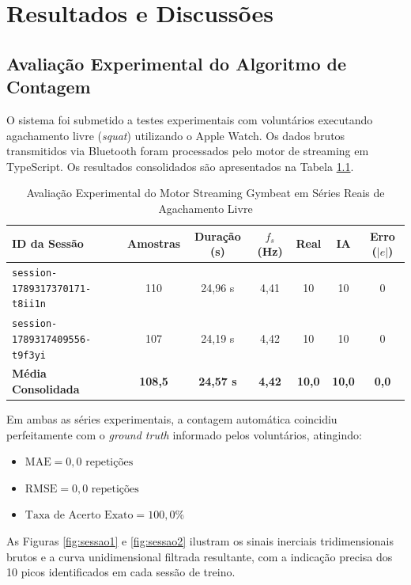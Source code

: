 \documentclass[12pt,openany,oneside,a4paper,english,brazil]{abntex2}
\begin{document}
\chapter{Resultados e Discussões}

\section{Avaliação Experimental do Algoritmo de Contagem}
O sistema foi submetido a testes experimentais com voluntários executando agachamento livre (\textit{squat}) utilizando o Apple Watch. Os dados brutos transmitidos via Bluetooth foram processados pelo motor de streaming em TypeScript. Os resultados consolidados são apresentados na Tabela \ref{tab:resultados}.

\begin{table}[H]
\centering
\caption{Avaliação Experimental do Motor Streaming Gymbeat em Séries Reais de Agachamento Livre}
\label{tab:resultados}
\begin{tabular}{lcccccc}
\toprule
\textbf{ID da Sessão} & \textbf{Amostras} & \textbf{Duração (s)} & \textbf{$f_s$ (Hz)} & \textbf{Real} & \textbf{IA} & \textbf{Erro ($|e|$)} \\
\midrule
\texttt{session-1789317370171-t8ii1n} & 110 & 24,96 s & 4,41 & 10 & 10 & 0 \\
\texttt{session-1789317409556-t9f3yi} & 107 & 24,19 s & 4,42 & 10 & 10 & 0 \\
\midrule
\textbf{Média Consolidada} & \textbf{108,5} & \textbf{24,57 s} & \textbf{4,42} & \textbf{10,0} & \textbf{10,0} & \textbf{0,0} \\
\bottomrule
\end{tabular}
\end{table}

Em ambas as séries experimentais, a contagem automática coincidiu perfeitamente com o \textit{ground truth} informado pelos voluntários, atingindo:
\begin{itemize}
    \item $\text{MAE} = 0{,}0\text{ repetições}$
    \item $\text{RMSE} = 0{,}0\text{ repetições}$
    \item $\text{Taxa de Acerto Exato} = 100{,}0\%$
\end{itemize}

As Figuras \ref{fig:sessao1} e \ref{fig:sessao2} ilustram os sinais inerciais tridimensionais brutos e a curva unidimensional filtrada resultante, com a indicação precisa dos 10 picos identificados em cada sessão de treino.
\end{document}

